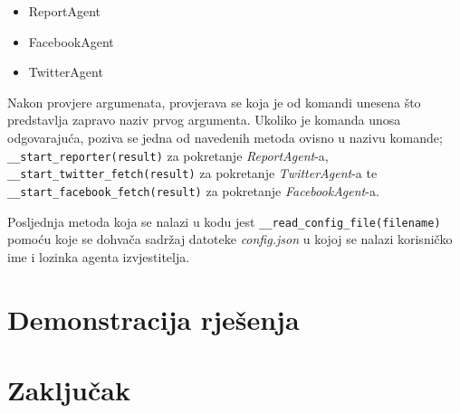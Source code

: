 \documentclass[a4paper,12pt]{foi}
\begin{document}
\begin{itemize}
\item{ReportAgent}
\item{FacebookAgent}
\item{TwitterAgent}
\end{itemize}

Nakon provjere argumenata, provjerava se koja je od komandi unesena što predstavlja zapravo naziv prvog argumenta. Ukoliko je komanda unosa odgovarajuća, poziva se jedna od navedenih metoda ovisno u nazivu komande; \texttt{\_\_start\_reporter(result)} za pokretanje \textit{ReportAgent}-a, \texttt{\_\_start\_twitter\_fetch(result)} za pokretanje \textit{TwitterAgent}-a te \texttt{\_\_start\_facebook\_fetch(result)} za pokretanje \textit{FacebookAgent}-a.

Posljednja metoda koja se nalazi u kodu jest \texttt{\_\_read\_config\_file(filename)} pomoću koje se dohvača sadržaj datoteke \textit{config.json} u kojoj se nalazi korisničko ime i lozinka agenta izvjestitelja.

\lstset{commentstyle=\textit,language=python}



\chapter{Demonstracija rješenja}


\chapter{Zaključak}



\end{document}
